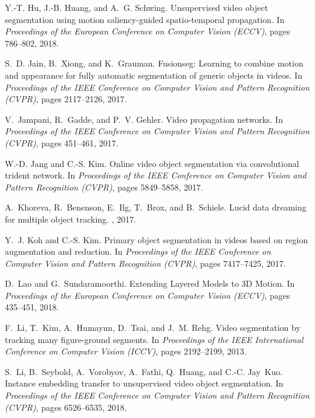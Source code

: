 \documentclass[10pt,twocolumn,letterpaper]{article}
\begin{document}
\begin{thebibliography}{10}
Y.-T. Hu, J.-B. Huang, and A.~G. Schwing.
\newblock Unsupervised video object segmentation using motion saliency-guided
  spatio-temporal propagation.
\newblock In {\em Proceedings of the European Conference on Computer Vision
  (ECCV)}, pages 786--802, 2018.

S.~D. Jain, B.~Xiong, and K.~Grauman.
\newblock Fusionseg: Learning to combine motion and appearance for fully
  automatic segmentation of generic objects in videos.
\newblock In {\em Proceedings of the IEEE Conference on Computer Vision and
  Pattern Recognition (CVPR)}, pages 2117--2126, 2017.

V.~Jampani, R.~Gadde, and P.~V. Gehler.
\newblock Video propagation networks.
\newblock In {\em Proceedings of the IEEE Conference on Computer Vision and
  Pattern Recognition (CVPR)}, pages 451--461, 2017.

W.-D. Jang and C.-S. Kim.
\newblock Online video object segmentation via convolutional trident network.
\newblock In {\em Proceedings of the IEEE Conference on Computer Vision and
  Pattern Recognition (CVPR)}, pages 5849--5858, 2017.

A.~Khoreva, R.~Benenson, E.~Ilg, T.~Brox, and B.~Schiele.
\newblock Lucid data dreaming for multiple object tracking.
, 2017.

Y.~J. Koh and C.-S. Kim.
\newblock Primary object segmentation in videos based on region augmentation
  and reduction.
\newblock In {\em Proceedings of the IEEE Conference on Computer Vision and
  Pattern Recognition (CVPR)}, pages 7417--7425, 2017.

D.~Lao and G.~Sundaramoorthi.
\newblock Extending {L}ayered {M}odels to 3{D} {M}otion.
\newblock In {\em Proceedings of the European Conference on Computer Vision
  (ECCV)}, pages 435--451, 2018.

F.~Li, T.~Kim, A.~Humayun, D.~Tsai, and J.~M. Rehg.
\newblock Video segmentation by tracking many figure-ground segments.
\newblock In {\em Proceedings of the IEEE International Conference on Computer
  Vision (ICCV)}, pages 2192--2199, 2013.

S.~Li, B.~Seybold, A.~Vorobyov, A.~Fathi, Q.~Huang, and C.-C. Jay~Kuo.
\newblock Instance embedding transfer to unsupervised video object
  segmentation.
\newblock In {\em Proceedings of the IEEE Conference on Computer Vision and
  Pattern Recognition (CVPR)}, pages 6526--6535, 2018.


\end{thebibliography}
\end{document}
